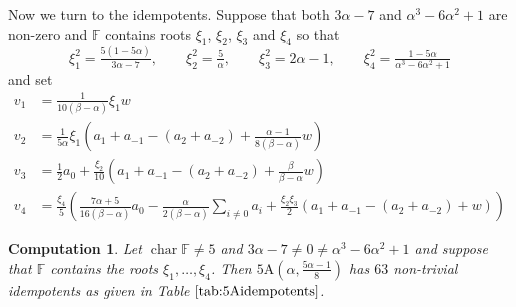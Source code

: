 \documentclass[11pt, a4paper]{article}
\theoremstyle{plain}
\newtheorem{computation}[theorem]{Computation}
\theoremstyle{definition}
\newcommand\al{\alpha}
\newcommand\bt{\beta}
\DeclareMathOperator{\ch}{char}
\newcommand\FF{\mathbb{F}}
\newcommand{\A}{\mathrm{A}}
\newcommand{\0}{\overline{0}}
\newcommand{\2}{\overline{2}}
\newcommand{\1}{\mathbbm{1}}
\newcommand{\rt}{\xi}
\begin{document}
Now we turn to the idempotents.  Suppose that both $3\al-7$ and $\al^3-6\al^2+1$ are non-zero and 
$\FF$ contains roots $\rt_1$, $\rt_2$, $\rt_3$ and $\rt_4$ so that
\[
\rt_1^2 = \tfrac{5(1-5\al)}{3\al-7}, \qquad \rt_2^2 = \tfrac{5}{\al}, \qquad \rt_3^2 = 2\al-1, \qquad \rt_4^2 = \tfrac{1-5\al}{\al^3-6\al^2+1}
\]
and set
\begin{align*}
v_1 &= \tfrac{1}{10(\bt-\al)} \rt_1 w\\
v_2 &= \tfrac{1}{5\al}\rt_1\left( a_1+a_{-1} - (a_2+a_{-2}) + \tfrac{\al-1}{8(\bt-\al)}w \right) \\
v_3 &= \tfrac{1}{2}a_0 + \tfrac{\rt_2}{10}\left( a_1+a_{-1} - (a_2+a_{-2})+ \tfrac{\bt}{\bt-\al}w \right) \\
v_4 &= \tfrac{\rt_4}{5} \left( \tfrac{7\al+5}{16(\bt-\al)}a_0  - \tfrac{\al}{2(\bt-\al)}\sum_{i\neq 0} a_i
                          + \tfrac{\rt_2\rt_3}{2}( a_1+a_{-1} - (a_2+a_{-2}) + w) \right)
\end{align*}

\begin{computation}
Let $\ch \FF \neq 5$ and $3\al-7 \neq 0 \neq \al^3-6\al^2+1$ and suppose that $\FF$ contains the roots $\rt_1, \dots, \rt_4$. Then $5\A(\al, \frac{5\al-1}{8})$ has $63$ non-trivial idempotents as given in Table $\ref{tab:5Aidempotents}$.
\end{computation}
\end{document}
